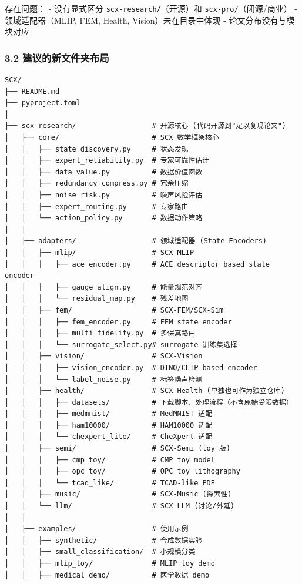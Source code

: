 \documentclass[
  12pt,
]{ctexart}
\begin{document}
存在问题： - 没有显式区分 \texttt{scx-research/}（开源）和
\texttt{scx-pro/}（闭源/商业） - 领域适配器（MLIP, FEM, Health,
Vision）未在目录中体现 - 论文分布没有与模块对应

\subsubsection{3.2
建议的新文件夹布局}\label{ux5efaux8baeux7684ux65b0ux6587ux4ef6ux5939ux5e03ux5c40}

\begin{verbatim}
SCX/
├── README.md
├── pyproject.toml
│
├── scx-research/                  # 开源核心 (代码开源到"足以复现论文")
│   ├── core/                      # SCX 数学框架核心
│   │   ├── state_discovery.py     # 状态发现
│   │   ├── expert_reliability.py  # 专家可靠性估计
│   │   ├── data_value.py          # 数据价值函数
│   │   ├── redundancy_compress.py # 冗余压缩
│   │   ├── noise_risk.py          # 噪声风险评估
│   │   ├── expert_routing.py      # 专家路由
│   │   └── action_policy.py       # 数据动作策略
│   │
│   ├── adapters/                  # 领域适配器 (State Encoders)
│   │   ├── mlip/                  # SCX-MLIP
│   │   │   ├── ace_encoder.py     # ACE descriptor based state encoder
│   │   │   ├── gauge_align.py     # 能量规范对齐
│   │   │   └── residual_map.py    # 残差地图
│   │   ├── fem/                   # SCX-FEM/SCX-Sim
│   │   │   ├── fem_encoder.py     # FEM state encoder
│   │   │   ├── multi_fidelity.py  # 多保真路由
│   │   │   └── surrogate_select.py# surrogate 训练集选择
│   │   ├── vision/                # SCX-Vision
│   │   │   ├── vision_encoder.py  # DINO/CLIP based encoder
│   │   │   └── label_noise.py     # 标签噪声检测
│   │   ├── health/                # SCX-Health (单独也可作为独立仓库)
│   │   │   ├── datasets/          # 下载脚本、处理流程（不含原始受限数据）
│   │   │   ├── medmnist/          # MedMNIST 适配
│   │   │   ├── ham10000/          # HAM10000 适配
│   │   │   └── chexpert_lite/     # CheXpert 适配
│   │   ├── semi/                  # SCX-Semi (toy 版)
│   │   │   ├── cmp_toy/           # CMP toy model
│   │   │   ├── opc_toy/           # OPC toy lithography
│   │   │   └── tcad_like/         # TCAD-like PDE
│   │   ├── music/                 # SCX-Music (探索性)
│   │   └── llm/                   # SCX-LLM (讨论/外延)
│   │
│   ├── examples/                  # 使用示例
│   │   ├── synthetic/             # 合成数据实验
│   │   ├── small_classification/  # 小规模分类
│   │   ├── mlip_toy/              # MLIP toy demo
│   │   ├── medical_demo/          # 医学数据 demo

\end{verbatim}
\end{document}
